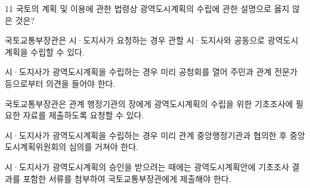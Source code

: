 \begin{question}{11}
국토의 계획 및 이용에 관한 법령상 광역도시계획의 수립에 관한 설명으로 옳지 않은 것은?
\begin{choices}
  \item 국토교통부장관은 시·도지사가 요청하는 경우 관할 시·도지사와 공동으로 광역도시계획을 수립할 수 있다.
  \item 시·도지사가 광역도시계획을 수립하는 경우 미리 공청회를 열어 주민과 관계 전문가 등으로부터 의견을 들어야 한다.
  \item 국토교통부장관은 관계 행정기관의 장에게 광역도시계획의 수립을 위한 기초조사에 필요한 자료를 제출하도록 요청할 수 있다.
  \item 시·도지사가 광역도시계획을 수립하는 경우 미리 관계 중앙행정기관과 협의한 후 중앙도시계획위원회의 심의를 거쳐야 한다.
  \item 시·도지사가 광역도시계획의 승인을 받으려는 때에는 광역도시계획안에 기초조사 결과를 포함한 서류를 첨부하여 국토교통부장관에게 제출해야 한다.
\end{choices}
\end{question}
